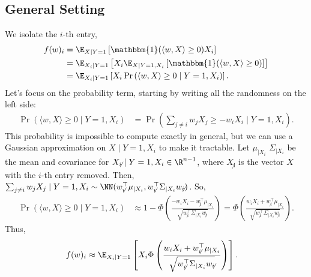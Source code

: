 \documentclass{article}
\begin{document}
\subsection{General Setting}
We isolate the $i$-th entry,%
\begin{align*}
  f(w)_i
  &= \E_{X \mid Y = 1} \left[ \mathbbm{1}(\langle w, X \rangle \geq 0) X_i \right] \\
  &= \E_{X_i \mid Y = 1} \left[ X_i \E_{ X \mid Y = 1, X_i } \left[ \mathbbm{1}(\langle w, X \rangle \geq 0) \right] \right] \\
  &= \E_{X_i \mid Y = 1} \left[ X_i \Pr\left( \langle w, X \rangle \geq 0 \mid Y = 1, X_i \right) \right].
\end{align*}
Let's focus on the probability term, starting by writing all the randomness on the left side:
\begin{align*}
  \Pr\left( \langle w, X \rangle \geq 0 \mid Y = 1, X_i \right)
  &= \Pr\left( \sum_{j \neq i} w_j X_j \geq -w_i X_i \mid Y = 1, X_i \right).
\end{align*}
This probability is impossible to compute exactly in general, but we can use a Gaussian approximation on $X \mid Y = 1, X_i$ to make it tractable.
Let $\mu_{\mid X_i}$ $\Sigma_{\mid X_i}$ be the mean and covariance for $X_{\not i} \mid Y = 1, X_i \in \R^{n-1}$, where $X_{\not i}$ is the vector $X$ with the $i$-th entry removed.
Then, $\sum_{j \neq i} w_j X_j \mid Y = 1, X_i \sim \NN(w_{\not i}^\top \mu_{\mid X_i}, w_{\not i}^\top \Sigma_{\mid X_i} w_{\not i})$.
So,
\begin{align*}
  \Pr\left( \langle w, X \rangle \geq 0 \mid Y = 1, X_i \right)
  &\approx 1 - \Phi\left( \frac{ -w_i X_i - w_{\not i}^\top \mu_{\mid X_i} }{ \sqrt{ w_{\not i}^\top \Sigma_{\mid X_i} w_{\not i} } } \right)
  = \Phi\left( \frac{ w_i X_i + w_{\not i}^\top \mu_{\mid X_i} }{ \sqrt{ w_{\not i}^\top \Sigma_{\mid X_i} w_{\not i} } } \right).
\end{align*}
Thus,
\begin{align}
  f(w)_i &\approx \E_{X_i \mid Y=1} \left[ X_i \Phi\left( \frac{ w_i X_i + w_{\not i}^\top \mu_{\mid X_i} }{ \sqrt{ w_{\not i}^\top \Sigma_{\mid X_i} w_{\not i} } } \right) \right]. \label{eq:fwi_seperated}
\end{align}
\end{document}
